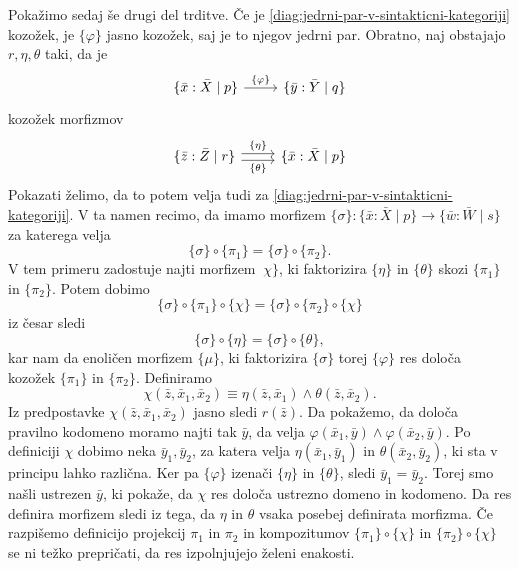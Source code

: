 \documentclass[../kategoricna_logika.tex]{subfiles}
\begin{document}
\begin{dokaz}
\begin{enumerate}[label=(\roman*)]
    Pokažimo sedaj še drugi del trditve.  Če je
    \eqref{diag:jedrni-par-v-sintakticni-kategoriji} kozožek, je
    $\{ \varphi \}$ jasno kozožek, saj je to njegov jedrni
    par. Obratno, naj obstajajo $r, \eta, \theta$ taki, da je
    \begin{equation*}
      \begin{tikzcd}
        {\lbrace \bar{x}:\bar{X} \mid p \rbrace}
        \ar[r, "{\lbrace \varphi \rbrace}"] &
        {\lbrace \bar{y}:\bar{Y} \mid q \rbrace}
      \end{tikzcd}
    \end{equation*}
    kozožek morfizmov
    \begin{equation*}
      \begin{tikzcd}
        \lbrace \bar{z}:\bar{Z} \mid r \rbrace \ar[r, shift left, "{\lbrace \eta \rbrace}"]
        \ar[r, shift right, "{\lbrace \theta \rbrace}"'] & {\lbrace \bar{x}:\bar{X} \mid p \rbrace}
      \end{tikzcd}
    \end{equation*}
    Pokazati želimo, da to potem velja tudi za
    \eqref{diag:jedrni-par-v-sintakticni-kategoriji}. V ta namen
    recimo, da imamo morfizem
    $\{ \sigma \} :  \{ \bar{x}:\bar{X} \mid p\} \to \{ \bar{w}:\bar{W} \mid s\}$ za katerega velja
    $$\{ \sigma \} \circ \{ \pi_1\} = \{ \sigma \} \circ \{\pi_2\}.$$
    V tem
    primeru zadostuje najti morfizem $\ \chi\}$, ki faktorizira
    ${\lbrace \eta\rbrace}$ in
    ${\lbrace \theta \rbrace}$ skozi
    $\{\pi_1\}$ in $\{\pi_2\}$. Potem  dobimo
    \[    \{ \sigma\} \circ \{ \pi_1\} \circ \{ \chi\} = \{\sigma \} \circ
      \{\pi_2\} \circ \{\chi\}\]
    iz česar sledi
    \[  \{ \sigma\} \circ {\lbrace \eta\rbrace} = \{\sigma \} \circ {\lbrace \theta \rbrace},\]
    kar
    nam da enoličen morfizem $\{\mu\}$, ki faktorizira $\{ \sigma \}$
    torej ${\lbrace \varphi \rbrace}$
    res določa kozožek $\{\pi_1\}$ in $\{\pi_2\}$. Definiramo
    \[ \chi(\bar{z}, \bar{x}_1, \bar{x}_2) \equiv \eta(\bar{z},\bar{x}_1) \land \theta(\bar{z},\bar{x}_2).\]
    Iz
    predpostavke $\chi(\bar{z},\bar{x}_1,\bar{x}_2)$ jasno sledi $r(\bar{z})$.  Da pokažemo,
    da določa pravilno kodomeno moramo najti tak $\bar{y}$, da velja
    $\varphi(\bar{x}_1,\bar{y}) \land \varphi(\bar{x}_2,\bar{y})$.  Po definiciji $\chi$
    dobimo neka $\bar{y}_1, \bar{y}_2$, za katera velja $\eta(\bar{x}_1,\bar{y}_1)$ in
    $\theta(\bar{x}_2,\bar{y}_2)$, ki sta v principu lahko različna. Ker pa
    ${\lbrace \varphi \rbrace}$ izenači
    ${\lbrace  \eta\rbrace}$ in
    ${\lbrace \theta \rbrace}$, sledi
    $\bar{y}_1 = \bar{y}_2$. Torej smo našli ustrezen $\bar{y}$, ki pokaže, da $\chi$
    res določa ustrezno domeno in kodomeno.  Da res definira morfizem
    sledi iz tega, da $\eta$ in $\theta$ vsaka posebej definirata
    morfizma.  Če razpišemo definicijo projekcij $\pi_1$ in $\pi_2$ in
    kompozitumov $\{\pi_1\} \circ \{\chi\}$ in
    $\{\pi_2\} \circ \{\chi\}$ se ni težko prepričati, da res
    izpolnjujejo želeni enakosti.


\end{enumerate}
\end{dokaz}
\end{document}
